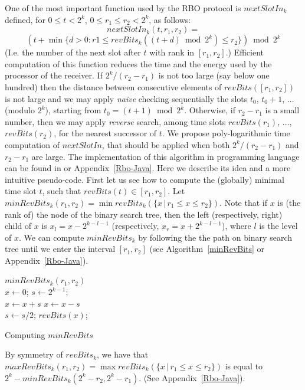 \documentclass{llncs}
\begin{document}
One of the most important function used by the RBO protocol is $nextSlotIn_k$ defined,
for $0\le t<2^k$, $0\le r_1\le r_2<2^k$, as follows:
$$
nextSlotIn_k(t, r_1, r_2)=
$$
$$
\left(t+\min\{d>0 : r1\le revBits_k( (t+d)\bmod 2^k   ) \le r_2\}\right) \bmod 2^k 
$$
(I.e. the number of the next slot after $t$ with rank in $[r_1,r_2]$.)
Efficient computation of this function reduces the 
time and the energy used by the processor of the receiver.
If $2^k/(r_2-r_1)$ is not too large (say below one hundred)
then the distance between consecutive elements of $revBits([r_1,r_2])$ 
is not large and we may apply {\em naive} checking sequentially the slots $t_0$, $t_0+1$, $\ldots$ (modulo $2^k$), 
starting from $t_0=(t+1)\bmod 2^k$. 
Otherwise, if $r_2-r_1$ is a small number, then we may apply {\em reverse} search, 
among time slots $revBits(r_1)$, $\ldots$, $revBits(r_2)$, 
for the nearest successor of $t$.
We propose poly-logarithmic time computation 
of $nextSlotIn$, 
that should be applied when both
$2^k/(r_2-r_1)$ and $r_2-r_1$ are large.
The implementation of this algorithm in programming language can be found in \cite{RBO-WWW} or Appendix~\ref{Rbo-Java}.
Here we describe its idea and a more intuitive pseudo-code.
First let us see how to compute the (globally)  minimal time slot $t$,
such that $revBits(t)\in [r_1,r_2]$.
Let $minRevBits_k(r_1,r_2)=\min revBits_k(\{x\, |\, r_1\le x\le r_2\})$.
Note that if $x$ is (the rank of) the node of the binary search tree,
then the left (respectively, right) child of $x$ is $x_l=x-2^{k-l-1}$ 
(respectively, $x_r=x+2^{k-l-1}$), where $l$ is the
level of $x$.
We can compute $minRevBits_k$ %
by following the the path on binary search tree until
we enter the interval $[r_1,r_2]$ (see Algorithm~\ref{minRevBits} or Appendix~\ref{Rbo-Java}).
\begin{algorithm}
  \KwFunction $minRevBits_k( r_1, r_2 )$\\
  $x\gets 0$; $s\gets 2^{k-1}$;\\
      {
            {
              $x\gets x+s$
            }
            \lElse 
                {
                  $x\gets x-s$
                }\\
                $s\gets s/2$;
      }
      \KwReturn $revBits(x)$;
      \caption{Computing $minRevBits$\label{minRevBits}}
\end{algorithm}
By symmetry of $revBits_k$, we have 
that $maxRevBits_k(r_1,r_2)=\max revBits_k(\{x\, |\, r_1\le x\le r_2\})$ is equal to
$2^k-minRevBits_k(2^k-r_2, 2^k-r_1)$.
(See Appendix~\ref{Rbo-Java}).
\end{document}
